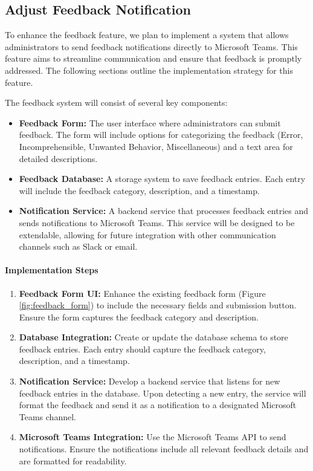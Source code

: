 \subsection{Adjust Feedback Notification}
To enhance the feedback feature, we plan to implement a system that allows administrators to send feedback notifications directly to Microsoft Teams. This feature aims to streamline communication and ensure that feedback is promptly addressed. The following sections outline the implementation strategy for this feature.

The feedback system will consist of several key components:

\begin{itemize}
    \item \textbf{Feedback Form:} The user interface where administrators can submit feedback. The form will include options for categorizing the feedback (Error, Incomprehensible, Unwanted Behavior, Miscellaneous) and a text area for detailed descriptions.
    \item \textbf{Feedback Database:} A storage system to save feedback entries. Each entry will include the feedback category, description, and a timestamp.
    \item \textbf{Notification Service:} A backend service that processes feedback entries and sends notifications to Microsoft Teams. This service will be designed to be extendable, allowing for future integration with other communication channels such as Slack or email.
\end{itemize}

\paragraph{Implementation Steps}
\begin{enumerate}
    \item \textbf{Feedback Form UI:} Enhance the existing feedback form (Figure \ref{fig:feedback_form}) to include the necessary fields and submission button. Ensure the form captures the feedback category and description.
    \item \textbf{Database Integration:} Create or update the database schema to store feedback entries. Each entry should capture the feedback category, description, and a timestamp.
    \item \textbf{Notification Service:} Develop a backend service that listens for new feedback entries in the database. Upon detecting a new entry, the service will format the feedback and send it as a notification to a designated Microsoft Teams channel.
    \item \textbf{Microsoft Teams Integration:} Use the Microsoft Teams API to send notifications. Ensure the notifications include all relevant feedback details and are formatted for readability.
\end{enumerate}

